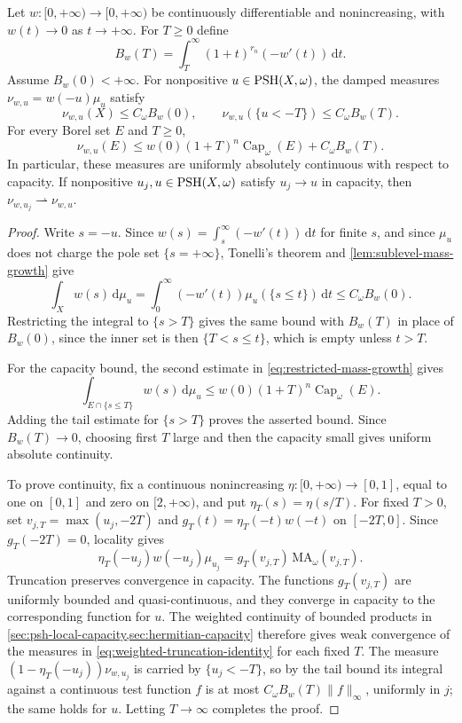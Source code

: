 \begin{theorem}\label{thm:damped-continuity}\label{prop:general-damping-weights}
Let $w\colon [0,+\infty)\to[0,+\infty)$ be continuously differentiable and nonincreasing, with $w(t)\to0$ as $t\to+\infty$. For $T\geq0$ define
\[
 B_w(T)=\int_T^\infty(1+t)^{r_n}(-w'(t))\,\mathrm{d}t.
\]
Assume $B_w(0)<+\infty$. For nonpositive $u\in\mathrm{PSH}(X,\omega)$, the damped measures
$\nu_{w,u}=w(-u)\mu_u$ satisfy
\[
 \nu_{w,u}(X)\leq C_\omega B_w(0),\qquad
 \nu_{w,u}(\{u<-T\})\leq C_\omega B_w(T).
\]
For every Borel set $E$ and $T\geq0$,
\[
 \nu_{w,u}(E)\leq
 w(0)(1+T)^n\operatorname{Cap}_\omega(E)+C_\omega B_w(T).
\]
In particular, these measures are uniformly absolutely continuous with respect to capacity. If nonpositive $u_j,u\in\mathrm{PSH}(X,\omega)$ satisfy $u_j\to u$ in capacity, then $\nu_{w,u_j}\rightharpoonup\nu_{w,u}$.
\end{theorem}
\begin{proof}
Write $s=-u$. Since $w(s)=\int_s^\infty(-w'(t))\,\mathrm{d}t$ for finite $s$, and since $\mu_u$ does not charge the pole set $\{s=+\infty\}$, Tonelli's theorem and \cref{lem:sublevel-mass-growth} give
\[
 \int_X w(s)\,\mathrm{d}\mu_u
 =\int_0^\infty(-w'(t))\mu_u(\{s\leq t\})\,\mathrm{d}t
 \leq C_\omega B_w(0).
\]
Restricting the integral to $\{s>T\}$ gives the same bound with $B_w(T)$ in place of $B_w(0)$, since the inner set is then $\{T<s\leq t\}$, which is empty unless $t>T$.

For the capacity bound, the second estimate in \eqref{eq:restricted-mass-growth} gives
\[
 \int_{E\cap\{s\leq T\}}w(s)\,\mathrm{d}\mu_u
 \leq w(0)(1+T)^n\operatorname{Cap}_\omega(E).
\]
Adding the tail estimate for $\{s>T\}$ proves the asserted bound. Since $B_w(T)\to0$, choosing first $T$ large and then the capacity small gives uniform absolute continuity.

To prove continuity, fix a continuous nonincreasing $\eta\colon [0,+\infty)\to[0,1]$, equal to one on $[0,1]$ and zero on $[2,+\infty)$, and put $\eta_T(s)=\eta(s/T)$. For fixed $T>0$, set $v_{j,T}=\max(u_j,-2T)$ and $g_T(t)=\eta_T(-t)w(-t)$ on $[-2T,0]$. Since $g_T(-2T)=0$, locality gives
\begin{equation}\label{eq:weighted-truncation-identity}
 \eta_T(-u_j)w(-u_j)\mu_{u_j}
 =g_T(v_{j,T})\,\mathrm{MA}_\omega(v_{j,T}).
\end{equation}
Truncation preserves convergence in capacity. The functions $g_T(v_{j,T})$ are uniformly bounded and quasi-continuous, and they converge in capacity to the corresponding function for $u$. The weighted continuity of bounded products in \cref{sec:psh-local-capacity,sec:hermitian-capacity} therefore gives weak convergence of the measures in \eqref{eq:weighted-truncation-identity} for each fixed $T$. The measure $(1-\eta_T(-u_j))\nu_{w,u_j}$ is carried by $\{u_j<-T\}$, so by the tail bound its integral against a continuous test function $f$ is at most $C_\omega B_w(T)\|f\|_\infty$, uniformly in $j$; the same holds for $u$. Letting $T\to\infty$ completes the proof.
\end{proof}

